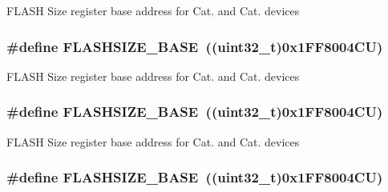 F\-L\-A\-S\-H Size register base address for Cat. and Cat. devices \hypertarget{group___peripheral__memory__map_ga776d985f2d4d40b588ef6ca9d573af78}{
\subsubsection[{F\-L\-A\-S\-H\-S\-I\-Z\-E\-\_\-\-B\-A\-S\-E}]{\setlength{\rightskip}{0pt plus 5cm}\#define F\-L\-A\-S\-H\-S\-I\-Z\-E\-\_\-\-B\-A\-S\-E~((uint32\-\_\-t)0x1\-F\-F8004\-C\-U)}}\label{group___peripheral__memory__map_ga776d985f2d4d40b588ef6ca9d573af78}
F\-L\-A\-S\-H Size register base address for Cat. and Cat. devices \hypertarget{group___peripheral__memory__map_ga776d985f2d4d40b588ef6ca9d573af78}{
\subsubsection[{F\-L\-A\-S\-H\-S\-I\-Z\-E\-\_\-\-B\-A\-S\-E}]{\setlength{\rightskip}{0pt plus 5cm}\#define F\-L\-A\-S\-H\-S\-I\-Z\-E\-\_\-\-B\-A\-S\-E~((uint32\-\_\-t)0x1\-F\-F8004\-C\-U)}}\label{group___peripheral__memory__map_ga776d985f2d4d40b588ef6ca9d573af78}
F\-L\-A\-S\-H Size register base address for Cat. and Cat. devices \hypertarget{group___peripheral__memory__map_ga776d985f2d4d40b588ef6ca9d573af78}{
\subsubsection[{F\-L\-A\-S\-H\-S\-I\-Z\-E\-\_\-\-B\-A\-S\-E}]{\setlength{\rightskip}{0pt plus 5cm}\#define F\-L\-A\-S\-H\-S\-I\-Z\-E\-\_\-\-B\-A\-S\-E~((uint32\-\_\-t)0x1\-F\-F8004\-C\-U)}}\label{group___peripheral__memory__map_ga776d985f2d4d40b588ef6ca9d573af78}
